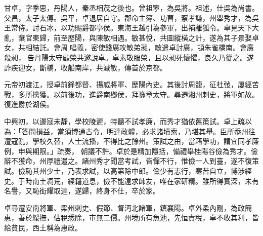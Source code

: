 \begin{pinyinscope}
 甘卓，字季思，丹陽人，秦丞相茂之後也。曾祖寧，為吳將。祖述，仕吳為尚書。父昌，太子太傅。吳平，卓退居自守。郡命主簿、功曹，察孝謙，州舉秀才，為吳王常侍。討石冰，以功賜爵都亭侯。東海王越引為參軍，出補離狐令。卓見天下大亂，棄官東歸，前至歷陽，與陳敏相遇。敏甚悅，共圖縱橫之計，遂為其子景娶卓女，共相結託。會周唱義，密使錢廣攻敏弟昶，敏遣卓討廣，頓朱雀橋南。會廣
 殺昶，告丹陽太守顧榮共邀說卓。卓素敬服榮，且以昶死懷懼，良久乃從之。遂詐疾迎女，斷橋，收船南岸，共滅敏，傳首於京都。



 元帝初渡江，授卓前鋒都督、揚威將軍、歷陽內史。其後討周馥，征杜弢，屢經苦戰，多所擒獲。以前後功，進爵南鄉侯，拜豫章太守。尋遷湘州刺史，將軍如故。復進爵於湖侯。



 中興初，以邊寇未靜，學校陵遲，特聽不試孝廉，而秀才猶依舊策試。卓上疏以為：「答問損益，當須博通古令，明達政體，必求諸墳索，乃堪其舉。臣所忝州往遭寇亂，學校久替，人士流播，不得比之餘州。策試之由，當藉學功，謂宜同孝廉例，申與期限。」疏奏，
 朝議不許。卓於是精加隱括，備禮舉桂陽谷儉為秀才。儉辭不獲命，州厚禮遣之。諸州秀才聞當考試，皆憚不行，惟儉一人到臺，遂不復策試。儉恥其州少士，乃表求試，以高第除中郎。儉少有志行，寒苦自立，博涉經史。于時南土凋荒，經籍道息，儉不能遠求師友，唯在家研精。雖所得實深，未有名譽，又恥衒耀取達，遂歸，終身不仕，卒於家。



 卓尋遷安南將軍、梁州刺史、假節、督沔北諸軍，鎮襄陽。卓外柔內剛，為政簡惠，善於綏撫，估稅悉除，市無二價。州境所有魚池，先恒責稅，卓不收其利，皆給貧民，西土稱為惠政。




\end{pinyinscope}
